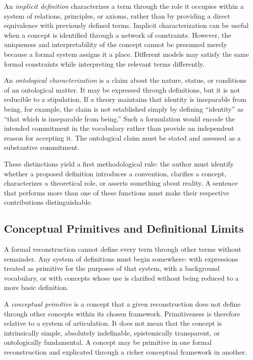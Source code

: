 An \emph{implicit definition} characterizes a term through the role it
occupies within a system of relations, principles, or axioms, rather
than by providing a direct equivalence with previously defined terms.
Implicit characterization can be useful when a concept is identified
through a network of constraints. However, the uniqueness and
interpretability of the concept cannot be presumed merely because a
formal system assigns it a place. Different models may satisfy the
same formal constraints while interpreting the relevant terms
differently.

An \emph{ontological characterization} is a claim about the nature,
status, or conditions of an ontological matter. It may be expressed
through definitions, but it is not reducible to a stipulation. If a
theory maintains that identity is inseparable from being, for example,
the claim is not established simply by defining ``identity'' as
``that which is inseparable from being.'' Such a formulation would
encode the intended commitment in the vocabulary rather than provide
an independent reason for accepting it. The ontological claim must be
stated and assessed as a substantive commitment.

These distinctions yield a first methodological rule: the author must
identify whether a proposed definition introduces a convention,
clarifies a concept, characterizes a theoretical role, or asserts
something about reality. A sentence that performs more than one of
these functions must make their respective contributions
distinguishable.

\subsection{Conceptual Primitives and Definitional Limits}

A formal reconstruction cannot define every term through other terms
without remainder. Any system of definitions must begin somewhere:
with expressions treated as primitive for the purposes of that
system, with a background vocabulary, or with concepts whose use is
clarified without being reduced to a more basic definition.

A \emph{conceptual primitive} is a concept that a given reconstruction
does not define through other concepts within its chosen framework.
Primitiveness is therefore relative to a system of articulation. It
does not mean that the concept is intrinsically simple, absolutely
indefinable, epistemically transparent, or ontologically fundamental.
A concept may be primitive in one formal reconstruction and explicated
through a richer conceptual framework in another.

